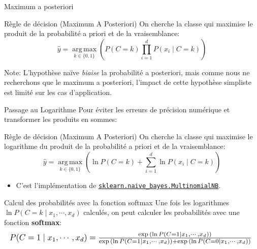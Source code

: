 \documentclass[10pt]{beamer}  %
\newcommand{\argmax}[1]{\underset{#1}{\operatorname{arg\,max}}}
\begin{document}
\begin{frame}{Maximum a posteriori}
	\begin{block}{Règle de décision (Maximum A Posteriori)}
		On cherche la classe qui maximise le produit de la probabilité a priori et de la vraisemblance:
		\begin{equation}
			\hat{y} = \argmax{k \in \{0, 1\}} \left( P(C = k) \prod_{i=1}^{d} P(x_i \mid C = k) \right)
			\nonumber
		\end{equation}
	\end{block}
	\pause
	Note: L'hypothèse naïve \textit{biaise} la probabilité a posteriori, mais comme nous ne recherchons que le maximum a posteriori, l'impact de cette hypothèse simpliste est limité sur les cas d'application.
\end{frame}

\begin{frame}{Passage au Logarithme}
	Pour éviter les erreurs de précision numérique et transformer les produits en sommes:
	\begin{block}{Règle de décision (Maximum A Posteriori)}
		On cherche la classe qui maximise le logarithme du produit de la probabilité a priori et de la vraisemblance:
		\begin{equation}
			\hat{y} = \argmax{k \in \{0, 1\}} \left( \ln P(C = k) + \sum_{i=1}^{d} \ln P(x_i \mid C = k) \right)
			\nonumber
		\end{equation}
	\end{block}
	\pause
	\begin{itemize}
		\item C'est l'implémentation de  \href{https://scikit-learn.org/stable/modules/generated/sklearn.naive_bayes.MultinomialNB.html}{\texttt{sklearn.naive\_bayes.MultinomialNB}}.
	\end{itemize}
\end{frame}

\begin{frame}{Calcul des probabilités avec la fonction softmax}
	Une fois les logarithmes $\ln P(C = k \mid x_1, \cdots, x_d)$ calculés, on peut calculer les probabilités avec une fonction \textbf{softmax}:
	\begin{equation}
		\resizebox{1.0\textwidth}{!}{%
		$P(C = 1 \mid x_1, \cdots, x_d) = \frac{\exp{\left(\ln P(C = 1  \mid x_1, \cdots, x_d)\right)}}{\exp{\left(\ln P(C = 1  \mid x_1, \cdots, x_d)\right)} + \exp{\left(\ln P(C = 0  \mid x_1, \cdots, x_d)\right)}}$
		}
		\nonumber
	\end{equation}
\end{frame}
\end{document}
